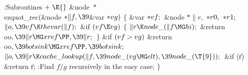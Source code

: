 \B{}:Subroutines\X${}\mathrel+\E{}$\6
\&{node} ${}{*}{}$\\{ezquot\_rec}(\&{node} ${}{*}\|f,\39{}$\&{var} ${}{*}%
\\{vg}){}$\1\1\2\2\6
${}\{{}$\1\6
\&{var} ${}{*}\\{vf};{}$\6
\&{node} ${}{*}\|r,{}$ ${}{*}\\{r0},{}$ ${}{*}\\{r1};{}$\7
${}\|o,\39\\{vf}\K\\{thevar}(\|f);{}$\6
\&{if} ${}(\\{vf}\E\\{vg}){}$\5
${}\{{}$\1\6
${}\|r\K\\{node\_}(\|f\MG\\{hi});{}$\6
\&{return} \\{oo}${},\39\|r\MG\\{xref}\PP,\39\|r;{}$\6
\4${}\}{}$\2\6
\&{if} ${}(\\{vf}>\\{vg}){}$\1\5
\&{return} \\{oo}${},\39\\{botsink}\MG\\{xref}\PP,\39\\{botsink};{}$\2\6
${}\|o,\39\|r\K\\{cache\_lookup}(\|f,\39\\{node\_}(\\{vg}\MG\\{elt}),\39\\{node%
\_}(\T{9}));{}$\6
\&{if} (\|r)\1\5
\&{return} \|r;\2\6
:Find $f/g$ recursively in the easy case\X;\6
\4${}\}{}$\2\par
\fi

